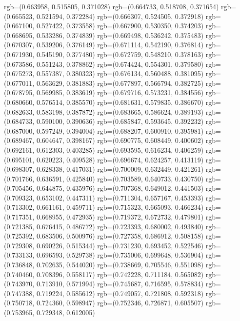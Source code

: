 {{{					rgb=(0.663958, 0.515805, 0.371028)
					rgb=(0.664733, 0.518708, 0.371654)
					rgb=(0.665523, 0.521594, 0.372284)
					rgb=(0.666307, 0.524505, 0.372918)
					rgb=(0.667100, 0.527422, 0.373558)
					rgb=(0.667900, 0.530350, 0.374203)
					rgb=(0.668695, 0.533286, 0.374839)
					rgb=(0.669498, 0.536242, 0.375483)
					rgb=(0.670307, 0.539206, 0.376149)
					rgb=(0.671114, 0.542190, 0.376814)
					rgb=(0.671930, 0.545190, 0.377480)
					rgb=(0.672759, 0.548210, 0.378163)
					rgb=(0.673586, 0.551243, 0.378862)
					rgb=(0.674424, 0.554301, 0.379580)
					rgb=(0.675273, 0.557387, 0.380323)
					rgb=(0.676134, 0.560488, 0.381095)
					rgb=(0.677011, 0.563629, 0.381883)
					rgb=(0.677897, 0.566794, 0.382725)
					rgb=(0.678795, 0.569985, 0.383619)
					rgb=(0.679716, 0.573231, 0.384556)
					rgb=(0.680660, 0.576514, 0.385570)
					rgb=(0.681631, 0.579835, 0.386670)
					rgb=(0.682633, 0.583198, 0.387872)
					rgb=(0.683665, 0.586624, 0.389193)
					rgb=(0.684733, 0.590100, 0.390636)
					rgb=(0.685847, 0.593645, 0.392232)
					rgb=(0.687000, 0.597249, 0.394004)
					rgb=(0.688207, 0.600910, 0.395981)
					rgb=(0.689467, 0.604647, 0.398167)
					rgb=(0.690775, 0.608449, 0.400602)
					rgb=(0.692161, 0.612303, 0.403285)
					rgb=(0.693595, 0.616234, 0.406259)
					rgb=(0.695101, 0.620223, 0.409528)
					rgb=(0.696674, 0.624257, 0.413119)
					rgb=(0.698307, 0.628338, 0.417031)
					rgb=(0.700009, 0.632449, 0.421261)
					rgb=(0.701766, 0.636591, 0.425840)
					rgb=(0.703589, 0.640733, 0.430750)
					rgb=(0.705456, 0.644875, 0.435976)
					rgb=(0.707368, 0.649012, 0.441503)
					rgb=(0.709323, 0.653102, 0.447311)
					rgb=(0.711304, 0.657167, 0.453393)
					rgb=(0.713302, 0.661161, 0.459711)
					rgb=(0.715323, 0.665093, 0.466234)
					rgb=(0.717351, 0.668955, 0.472935)
					rgb=(0.719372, 0.672732, 0.479801)
					rgb=(0.721385, 0.676415, 0.486772)
					rgb=(0.723393, 0.680002, 0.493840)
					rgb=(0.725392, 0.683506, 0.500976)
					rgb=(0.727358, 0.686912, 0.508158)
					rgb=(0.729308, 0.690226, 0.515344)
					rgb=(0.731230, 0.693452, 0.522546)
					rgb=(0.733133, 0.696593, 0.529738)
					rgb=(0.735006, 0.699648, 0.536904)
					rgb=(0.736848, 0.702635, 0.544020)
					rgb=(0.738669, 0.705546, 0.551098)
					rgb=(0.740460, 0.708396, 0.558117)
					rgb=(0.742228, 0.711184, 0.565082)
					rgb=(0.743970, 0.713910, 0.571994)
					rgb=(0.745687, 0.716595, 0.578834)
					rgb=(0.747388, 0.719224, 0.585612)
					rgb=(0.749057, 0.721808, 0.592318)
					rgb=(0.750718, 0.724360, 0.598947)
					rgb=(0.752346, 0.726871, 0.605507)
					rgb=(0.753965, 0.729348, 0.612005)
}}}
